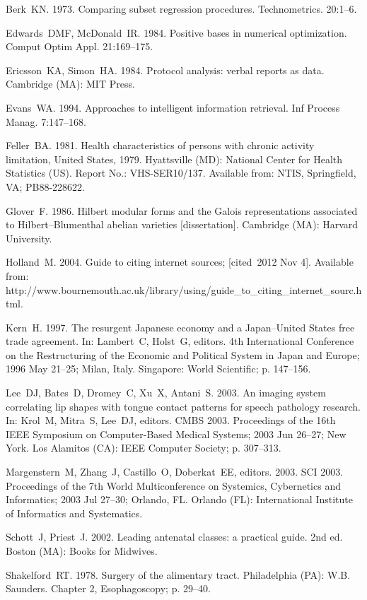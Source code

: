 \documentclass{gCMB2e}
\begin{document}
\begin{thebibliography}{12}

Berk~KN. 1973. Comparing subset regression procedures. Technometrics. 20:1--6.

Edwards~DMF, McDonald~IR. 1984. Positive bases in numerical optimization.
  Comput Optim Appl. 21:169--175.

Ericsson~KA, Simon~HA. 1984. Protocol analysis: verbal reports as data.
  Cambridge (MA): MIT Press.

Evans~WA. 1994. Approaches to intelligent information retrieval. Inf Process
  Manag. 7:147--168.

Feller~BA. 1981. Health characteristics of persons with chronic activity
  limitation, {U}nited {S}tates, 1979. Hyattsville (MD): National Center for
  Health Statistics ({US}). Report No.: VHS-SER10/137. Available from: NTIS,
  Springfield, VA; PB88-228622.

Glover~F. 1986. Hilbert modular forms and the {G}alois representations
  associated to {H}ilbert--{B}lumenthal abelian varieties [dissertation].
  Cambridge (MA): Harvard University.

Holland~M. 2004. Guide to citing internet sources; [cited~2012 Nov 4].
  Available from:
  http://www.bournemouth.ac.uk/library/using/guide\_to\_citing\_internet\_sourc.html.

Kern~H. 1997. The resurgent {J}apanese economy and a {J}apan--{U}nited {S}tates
  free trade agreement. In: Lambert~C, Holst~G, editors. 4th International
  Conference on the Restructuring of the Economic and Political System in Japan
  and Europe; 1996 May 21--25; Milan, Italy. Singapore: World Scientific; p.
  147--156.

Lee~DJ, Bates~D, Dromey~C, Xu~X, Antani~S. 2003. An imaging system correlating
  lip shapes with tongue contact patterns for speech pathology research. In:
  Krol~M, Mitra~S, Lee~DJ, editors. CMBS 2003. Proceedings of the 16th IEEE
  Symposium on Computer-Based Medical Systems; 2003 Jun 26--27; New York.
  Los Alamitos (CA): IEEE Computer Society; p. 307--313.

Margenstern~M, Zhang~J, Castillo~O, Doberkat~EE, editors. 2003. SCI 2003.
  Proceedings of the 7th World Multiconference on Systemics, Cybernetics and
  Informatics; 2003 Jul 27--30; Orlando, FL. Orlando (FL): International
  Institute of Informatics and Systematics.

Schott~J, Priest~J. 2002. Leading antenatal classes: a practical guide. 2nd ed.
  Boston (MA): Books for Midwives.

Shakelford~RT. 1978. Surgery of the alimentary tract. Philadelphia (PA): W.B.
  Saunders. Chapter 2, Esophagoscopy; p. 29--40.

\end{thebibliography}
\end{document}
